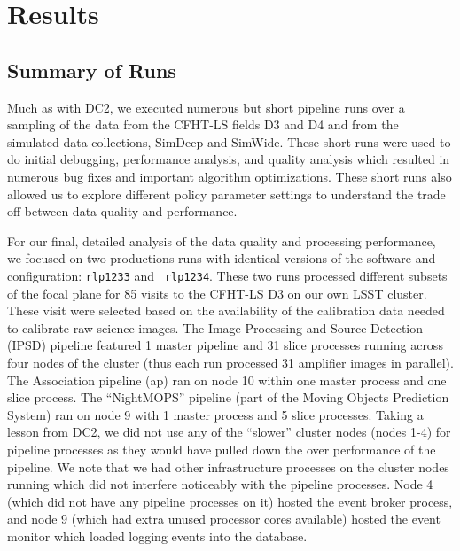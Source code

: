 \newcommand{\stc}[1]{\hbox to 2.5em{{#1}\hfil}}

\section{Results}

\subsection{Summary of Runs}

Much as with DC2, we executed numerous but short pipeline runs over
a sampling of the data from the CFHT-LS fields D3 and D4 and from the
simulated data collections, SimDeep and SimWide.  These short runs
were used to do initial debugging, performance analysis, and quality
analysis which resulted in numerous bug fixes and important algorithm
optimizations.  These short runs also allowed us to explore different
policy parameter settings to understand the trade off between data
quality and performance.  

For our final, detailed analysis of the data quality and processing
performance, we focused on two productions runs with identical
versions of the software and configuration: {\tt rlp1233} and {\tt
rlp1234}.  These two runs
processed different subsets of the focal plane for 85 visits to the
CFHT-LS D3 on our own LSST cluster.  These visit were selected based
on the availability of the calibration data needed to calibrate raw
science images.  The Image Processing and Source Detection (IPSD)
pipeline featured 1 master pipeline and 31 slice processes running
across four nodes of the cluster (thus each run processed 31 amplifier
images in parallel).  The Association pipeline (ap) ran on node 10
within one master process and one slice process.  The ``NightMOPS''
pipeline (part of the Moving Objects Prediction System) ran on node 9
with 1 master process and 5 slice processes.  Taking a lesson from
DC2, we did not use any of the ``slower'' cluster nodes (nodes 1-4)
for pipeline processes as they would have pulled down the over
performance of the pipeline.  We note that we had other infrastructure
processes on the cluster nodes running which did not interfere
noticeably with the pipeline processes.  Node 4 (which did not have
any pipeline processes on it) hosted the event broker process, and
node 9 (which had extra unused processor cores available) hosted the
event monitor which loaded logging events into the database.

